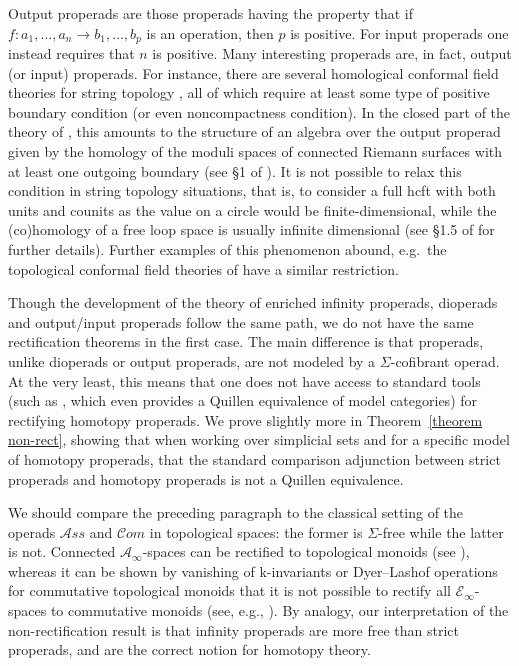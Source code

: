 \documentclass{amsart}
\numberwithin{theorem}{subsection}
\theoremstyle{definition}
\begin{document}
Output properads are those properads having the property that if $f \colon a_1, \dots, a_n \to b_1, \dots, b_p$ is an operation, then $p$ is positive.
For input properads one instead requires that $n$ is positive.
Many interesting properads are, in fact, output (or input) properads.
For instance, there are several homological conformal field theories for string topology \cite{ChataurMenichi:STCS,CohenGodin:PVST,Godin,HepworthLahtinen:OSTCS}, all of which require at least some type of positive boundary condition (or even noncompactness condition).
In the closed part of the theory of \cite{Godin}, this amounts to the structure of an algebra over the output properad given by the homology of the moduli spaces of connected Riemann surfaces with at least one outgoing boundary (see \S1 of \cite{Tamanoi:SSOT}).
It is not possible to relax this condition in string topology situations, that is, to consider a full hcft with both units and counits as the value on a circle would be finite-dimensional, while the (co)homology of a free loop space is usually infinite dimensional (see \S1.5 of \cite{HepworthLahtinen:OSTCS} for further details).
Further examples of this phenomenon abound, e.g.\ the topological conformal field theories of \cite[\S1.1]{Costello:TCFTCYC} have a similar restriction.

Though the development of the theory of enriched infinity properads, dioperads and output/input properads follow the same path, we do not have the same rectification theorems in the first case.
The main difference is that properads, unlike dioperads or output properads, are not modeled by a $\Sigma$-cofibrant operad.
At the very least, this means that one does not have access to standard tools (such as \cite[Theorem 4.4]{BergerMoerdijk}, which even provides a Quillen equivalence of model categories) for rectifying homotopy properads.
We prove slightly more in Theorem~\ref{theorem non-rect}, showing that when working over simplicial sets and for a specific model of homotopy properads, that the standard comparison adjunction between strict properads and homotopy properads is not a Quillen equivalence.

We should compare the preceding paragraph to the classical setting of the operads $\mathcal{A}ss$ and $\mathcal{C}om$ in topological spaces: the former is $\Sigma$-free while the latter is not.
Connected $\mathcal{A}_\infty$-spaces can be rectified to topological monoids (see \cite{BoardmanVogt,May,Stasheff:HAHSI}), whereas it can be shown by vanishing of k-invariants or Dyer--Lashof operations for commutative topological monoids that it is not possible to rectify all $\mathcal{E}_\infty$-spaces to commutative monoids (see, e.g., \cite[p.203]{BoardmanVogt}).
By analogy, our interpretation of the non-rectification result is that infinity properads are more free than strict properads, and are the correct notion for homotopy theory.
\end{document}
